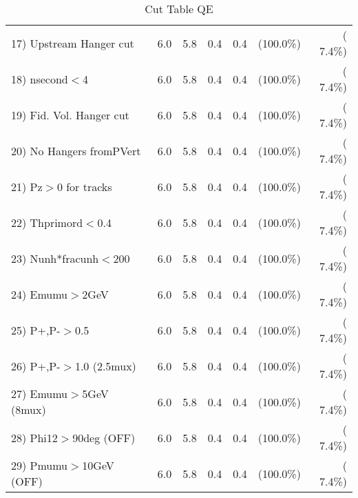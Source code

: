 \begin{table}[h!]
\begin{tabular}{||l||r|r|r|r|r|r||}
 17) Upstream Hanger cut  &          6.0 &          5.8 &          0.4 &          0.4 & (100.0\%) & (  7.4\%) \\
 18) nsecond$<$4          &          6.0 &          5.8 &          0.4 &          0.4 & (100.0\%) & (  7.4\%) \\
 19) Fid. Vol. Hanger cut &          6.0 &          5.8 &          0.4 &          0.4 & (100.0\%) & (  7.4\%) \\
 20) No Hangers fromPVert &          6.0 &          5.8 &          0.4 &          0.4 & (100.0\%) & (  7.4\%) \\
 21) Pz$>$0 for tracks    &          6.0 &          5.8 &          0.4 &          0.4 & (100.0\%) & (  7.4\%) \\
 22) Thprimord$<$0.4      &          6.0 &          5.8 &          0.4 &          0.4 & (100.0\%) & (  7.4\%) \\
 23) Nunh*fracunh$<$200   &          6.0 &          5.8 &          0.4 &          0.4 & (100.0\%) & (  7.4\%) \\
 24) Emumu$>$2GeV         &          6.0 &          5.8 &          0.4 &          0.4 & (100.0\%) & (  7.4\%) \\
 25) P+,P-$>$0.5          &          6.0 &          5.8 &          0.4 &          0.4 & (100.0\%) & (  7.4\%) \\
 26) P+,P-$>$1.0 (2.5mux) &          6.0 &          5.8 &          0.4 &          0.4 & (100.0\%) & (  7.4\%) \\
 27) Emumu$>$5GeV  (8mux) &          6.0 &          5.8 &          0.4 &          0.4 & (100.0\%) & (  7.4\%) \\
 28) Phi12$>$90deg  (OFF) &          6.0 &          5.8 &          0.4 &          0.4 & (100.0\%) & (  7.4\%) \\
 29) Pmumu$>$10GeV  (OFF) &          6.0 &          5.8 &          0.4 &          0.4 & (100.0\%) & (  7.4\%) \\
 \hline
 \hline
 \end{tabular}
 \caption{Cut Table  QE       }
 \label{tab-cutcohjpsi-mumu_qe}
 \end{table}
